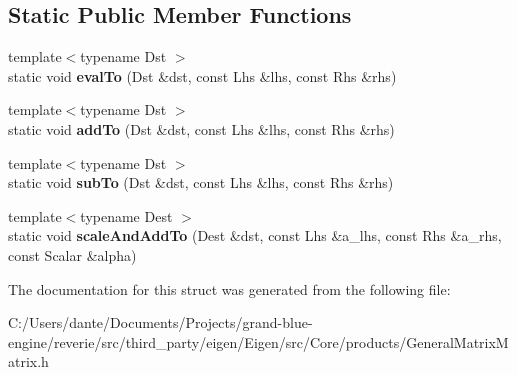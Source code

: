 \subsection*{Static Public Member Functions}
\begin{DoxyCompactItemize}
\item 
\mbox{\label{struct_eigen_1_1internal_1_1generic__product__impl_3_01_lhs_00_01_rhs_00_01_dense_shape_00_01_def53e16cb724bbb32f6918835a9970bd5_aa89f104fd9e52d048200c7322f36da62}} 
{\footnotesize template$<$typename Dst $>$ }\\static void {\bfseries eval\+To} (Dst \&dst, const Lhs \&lhs, const Rhs \&rhs)
\item 
\mbox{\label{struct_eigen_1_1internal_1_1generic__product__impl_3_01_lhs_00_01_rhs_00_01_dense_shape_00_01_def53e16cb724bbb32f6918835a9970bd5_ac90997f3a150d53a3574604ca61403de}} 
{\footnotesize template$<$typename Dst $>$ }\\static void {\bfseries add\+To} (Dst \&dst, const Lhs \&lhs, const Rhs \&rhs)
\item 
\mbox{\label{struct_eigen_1_1internal_1_1generic__product__impl_3_01_lhs_00_01_rhs_00_01_dense_shape_00_01_def53e16cb724bbb32f6918835a9970bd5_a4ab7938d01c375e504756856e8cd9544}} 
{\footnotesize template$<$typename Dst $>$ }\\static void {\bfseries sub\+To} (Dst \&dst, const Lhs \&lhs, const Rhs \&rhs)
\item 
\mbox{\label{struct_eigen_1_1internal_1_1generic__product__impl_3_01_lhs_00_01_rhs_00_01_dense_shape_00_01_def53e16cb724bbb32f6918835a9970bd5_afdc6730448aab0a09ace45e90ae31634}} 
{\footnotesize template$<$typename Dest $>$ }\\static void {\bfseries scale\+And\+Add\+To} (Dest \&dst, const Lhs \&a\+\_\+lhs, const Rhs \&a\+\_\+rhs, const Scalar \&alpha)
\end{DoxyCompactItemize}


The documentation for this struct was generated from the following file\+:\begin{DoxyCompactItemize}
\item 
C\+:/\+Users/dante/\+Documents/\+Projects/grand-\/blue-\/engine/reverie/src/third\+\_\+party/eigen/\+Eigen/src/\+Core/products/General\+Matrix\+Matrix.\+h\end{DoxyCompactItemize}
